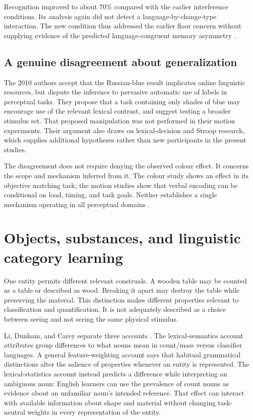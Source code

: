 Recognition improved to about 70\% compared with the earlier interference
conditions. Its analysis again did not detect a language-by-change-type
interaction. The new condition thus addressed the earlier floor concern
without supplying evidence of the predicted language-congruent memory
asymmetry \cite[pp.~76--78,Table~3,Figs.~7--8]{TrueswellPapafragou2010DualTaskLC}.

\subsection{A genuine disagreement about generalization}

The 2010 authors accept that the Russian-blue result implicates online
linguistic resources, but dispute the inference to pervasive automatic
use of labels in perceptual tasks. They propose that a task containing
only shades of blue may encourage use of the relevant lexical contrast,
and suggest testing a broader stimulus set. That proposed manipulation
was not performed in their motion experiments. Their argument also
draws on lexical-decision and Stroop research, which supplies additional
hypotheses rather than new participants in the present studies.

The disagreement does not require denying the observed colour effect.
It concerns the scope and mechanism inferred from it. The colour study
shows an effect in its objective matching task; the motion studies show
that verbal encoding can be conditional on load, timing, and task goals.
Neither establishes a single mechanism operating in all perceptual domains
\cite[pp.~79--80]{TrueswellPapafragou2010DualTaskLC}.

\section{Objects, substances, and linguistic category learning}
\label{sec:p19-lc-entity-accounts}

One entity permits different relevant construals. A wooden table may be
counted as a table or described as wood. Breaking it apart may destroy
the table while preserving the material. This distinction makes different
properties relevant to classification and quantification. It is not
adequately described as a choice between seeing and not seeing the same
physical stimulus.

Li, Dunham, and Carey separate three accounts
\cite[pp.~488--492]{LiDunhamCarey2009SubstanceLC}.
The lexical-semantics account attributes group differences to what nouns
mean in count/mass versus classifier languages. A general feature-weighting
account says that habitual grammatical distinctions alter the salience
of properties whenever an entity is represented. The lexical-statistics
account instead predicts a difference while interpreting an ambiguous
noun: English learners can use the prevalence of count nouns as evidence
about an unfamiliar noun's intended reference. That effect can interact
with available information about shape and material without changing
task-neutral weights in every representation of the entity.

